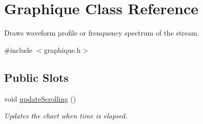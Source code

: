 \hypertarget{classGraphique}{
\section{Graphique Class Reference}
\label{classGraphique}
}


Draws waveform profile or frenquency spectrum of the stream.  




{\ttfamily \#include $<$graphique.h$>$}

\subsection*{Public Slots}
\begin{DoxyCompactItemize}
\item 
\hypertarget{classGraphique_a5523f8c7eed4d6ec8cda7554fe9a6682}{
void \hyperlink{classGraphique_a5523f8c7eed4d6ec8cda7554fe9a6682}{updateScrolling} ()}
\label{classGraphique_a5523f8c7eed4d6ec8cda7554fe9a6682}

\begin{DoxyCompactList}\small\item\em Updates the chart when time is elapsed. \item\end{DoxyCompactList}\end{DoxyCompactItemize}
